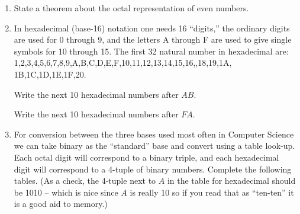 \begin{enumerate}
\wbvfill


\item State a theorem about the octal representation of even numbers.

\wbvfill


\item In hexadecimal (base-16) notation one needs 16 ``digits,'' the
  ordinary digits are used for 0 through 9, and the letters A through
  F are used to give single symbols for 10 through 15.  The first  32
  natural number in hexadecimal are:
  1,2,3,4,5,6,7,8,9,A,B,C,D,E,F,10,11,12,13,14,15,16,,18,19,1A,
  1B,1C,1D,1E,1F,20. 

  Write the next 10 hexadecimal numbers after $AB$.

  Write the next 10 hexadecimal numbers after $FA$.


\wbvfill

\workbookpagebreak

\item For conversion between the three bases used most often in 
Computer Science we can take binary as the ``standard'' base and 
convert using a table look-up.  Each octal digit will correspond 
to a binary triple, and each hexadecimal digit will correspond to 
a 4-tuple of binary numbers.  Complete the following tables.  
(As a check, the 4-tuple next to $A$ in the table for
hexadecimal should be 1010 -- which is nice since $A$ 
is really 10 so if you read that as ``ten-ten'' it is a good 
aid to memory.)


\end{enumerate}
